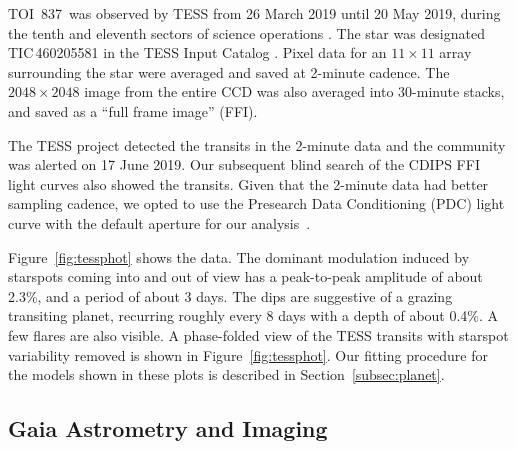 \documentclass[12pt,twocolumn,tighten]{aastex63}
\newcommand{\tn}{TOI~837} %
\begin{document}
\tn\ was observed by TESS from 26 March 2019 until 20 May 2019, during
the tenth and eleventh sectors of science operations
\citep{ricker_transiting_2015}.  The star was designated
TIC\,460205581 in the TESS Input Catalog
\citep{stassun_TIC_2018,stassun_TIC8_2019}.  Pixel data for an
$11\times11$ array surrounding the star were averaged and saved at
2-minute cadence.  The $2048\times2048$ image from the entire CCD was
also averaged into 30-minute stacks, and saved as a ``full frame
image'' (FFI).

The TESS project detected the transits in the 2-minute data and the
community was alerted on 17 June 2019.  Our subsequent blind search of
the CDIPS FFI light curves also showed the transits. Given that the
2-minute data had better sampling cadence, we opted to use the
Presearch Data Conditioning (PDC) light curve with the default
aperture for our
analysis~\citep{smith_kepler_2012,stumpe_multiscale_2014,jenkins_tess_2016,smith_finding_2016}.

Figure~\ref{fig:tessphot} shows the data.  The dominant modulation
induced by starspots coming into and out of view has a peak-to-peak
amplitude of about 2.3\%, and a period of about 3 days.  The dips are
suggestive of a grazing transiting planet, recurring roughly every 8
days with a depth of about 0.4\%.  A few flares are also visible.  A
phase-folded view of the TESS transits with starspot variability
removed is shown in Figure~\ref{fig:tessphot}. Our fitting procedure
for the models shown in these plots is described in
Section~\ref{subsec:planet}.


\subsection{Gaia Astrometry and Imaging}
\label{subsec:gaia}
\end{document}
